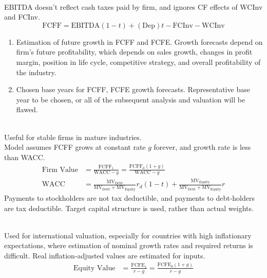 \begin{remark} \\
EBITDA doesn't reflect cash taxes paid by firm, and ignores CF effects of WCInv and FCInv.
\begin{equation}
\text{FCFF} = \text{EBITDA}(1-t) + (\text{Dep})t - \text{FCInv} - \text{WCInv} \nonumber
\end{equation}
\end{remark}

\begin{remark} 
\begin{enumerate}[label=\roman*.]
\setlength{\itemsep}{0pt}
\item Estimation of future growth in FCFF and FCFE. Growth forecasts depend on firm's future profitability, which depends on sales growth, changes in profit margin, position in life cycle, competitive strategy, and overall profitability of the industry.
\item Chosen base years for FCFF, FCFE growth forecasts. Representative base year to be chosen, or all of the subsequent analysis and valuation will be flawed.
\end{enumerate}
\end{remark}

\begin{method} \\
Useful for stable firms in mature industries.\\
Model assumes FCFF grows at constant rate $g$ forever, and growth rate is less than WACC.
\begin{align}
\text{Firm Value} &= \frac{\text{FCFF}_1}{\text{WACC}-g} = \frac{\text{FCFF}_0 (1+g)}{\text{WACC}-g} \nonumber \\
\text{WACC} &= \frac{\text{MV}_{\text{Debt}}}{\text{MV}_{\text{Debt}} + \text{MV}_{\text{Equity}}} r_d (1-t) + \frac{\text{MV}_{\text{Equity}}}{\text{MV}_{\text{Debt}} + \text{MV}_{\text{Equity}}}r \nonumber
\end{align}
Payments to stockholders are not tax deductible, and payments to debt-holders are tax deductible. Target capital structure is used, rather than actual weights.
\end{method}

\begin{method} \\
Used for international valuation, especially for countries with high inflationary expectations, where estimation of nominal growth rates and required returns is difficult. Real inflation-adjusted values are estimated for inputs.
\begin{align}
\text{Equity Value} &= \frac{\text{FCFE}_1}{r-g} = \frac{\text{FCFE}_0 (1+g)}{r-g} \nonumber
\end{align}
\end{method}


